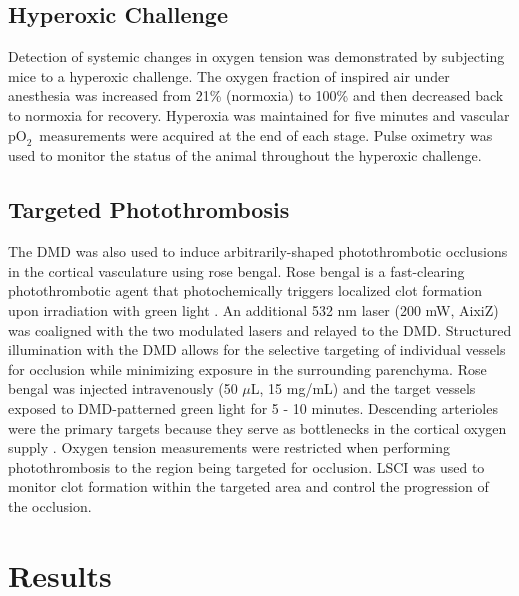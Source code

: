 \documentclass[12pt]{spieman}  %
\newcommand{\pO}{\ensuremath{\text{pO}_2}}
\begin{document}
\begin{spacing}{2}

\subsection{Hyperoxic Challenge}
Detection of systemic changes in oxygen tension was demonstrated by subjecting mice to a hyperoxic challenge. The oxygen fraction of inspired air under anesthesia was increased from 21\% (normoxia) to 100\% and then decreased back to normoxia for recovery. Hyperoxia was maintained for five minutes and vascular \pO\ measurements were acquired at the end of each stage. Pulse oximetry was used to monitor the status of the animal throughout the hyperoxic challenge.


\subsection{Targeted Photothrombosis}
The DMD was also used to induce arbitrarily-shaped photothrombotic occlusions in the cortical vasculature using rose bengal. Rose bengal is a fast-clearing photothrombotic agent that photochemically triggers localized clot formation upon irradiation with green light \cite{Watson:1985bp,Klaassen:1976kg,Wilson:1991tv}. An additional 532 nm laser (200 mW, AixiZ) was coaligned with the two modulated lasers and relayed to the DMD. Structured illumination with the DMD allows for the selective targeting of individual vessels for occlusion while minimizing exposure in the surrounding parenchyma. Rose bengal was injected intravenously (50 $\mu$L, 15 mg/mL) and the target vessels exposed to DMD-patterned green light for 5 - 10 minutes. Descending arterioles were the primary targets because they serve as bottlenecks in the cortical oxygen supply \cite{Nishimura:2007hk}. Oxygen tension measurements were restricted when performing photothrombosis to the region being targeted for occlusion. LSCI was used to monitor clot formation within the targeted area and control the progression of the occlusion.


\section{Results}
\label{sect:results}


\end{spacing}
\end{document}
